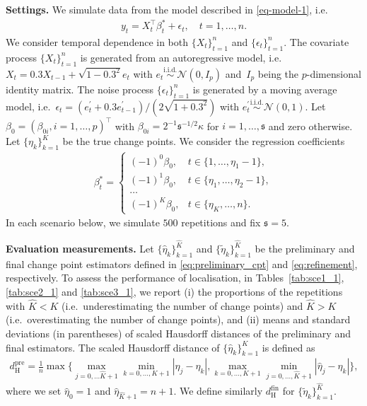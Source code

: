 \documentclass[11pt]{article}
\newcommand{\s}{ { \mathfrak{s}  } }
\theoremstyle{plain}
\theoremstyle{definition}
\begin{document}
\medskip
\noindent \textbf{Settings.} 
We simulate data from the model described in \eqref{eq-model-1}, i.e.
\begin{align*}
  y_t = X_t^{\top}\beta_t^* + \epsilon_t, \quad t = 1, \dots, n.
\end{align*}
We consider temporal dependence in both $\{X_t\}_{t = 1}^n$ and $\{\epsilon_t\}_{t = 1}^n$. The covariate process $\{X_t\}_{t = 1}^n$ is generated from an autoregressive model, i.e.~$X_t = 0.3X_{t-1}+\sqrt{1-0.3^2}e_t$ with $e_t \overset{\mbox{i.i.d.}}{\sim} \mathcal{N}(0, I_p)$ and~$I_p$ being the $p$-dimensional identity matrix. The noise process $\{\epsilon_t\}_{t = 1}^n$ is generated by a moving average model, i.e.~$\epsilon_t = (e^{\prime}_{t}+0.3e^{\prime}_{t-1})/(2\sqrt{1+0.3^2})$ with $e^{\prime}_t \overset{\mbox{i.i.d.}}{\sim} \mathcal{N}(0, 1)$. Let $\beta_0 = (\beta_{0i}, i = 1, \dots, p)^{\top}$ with $\beta_{0i} = 2^{-1}\s^{-1/2}\kappa$ for $i = 1, \dots, \s$ and zero otherwise. Let $\{\eta_k\}_{k = 1}^{K}$ be the true change points.  We consider the regression coefficients
\begin{align*}
    \beta_t^* = \begin{cases}
        (-1)^0\beta_0, &t \in \{1, \dots, \eta_1-1\},\\
        (-1)^1\beta_0, &t \in \{\eta_1, \dots, \eta_2-1\},\\
        \dots \\
        (-1)^{K}\beta_0, &t \in \{\eta_{K}, \dots, n\}.
    \end{cases}
\end{align*}
In each scenario below, we simulate $500$ repetitions and fix $\s = 5$.

\medskip
\noindent \textbf{Evaluation measurements.} Let $\{\widehat{\eta}_k\}_{k = 1}^{\widehat{K}}$ and $\{\widetilde{\eta}_k\}_{k = 1}^{\widehat{K}}$ be the preliminary and final change point estimators defined in \eqref{eq:preliminary_cpt} and \eqref{eq:refinement}, respectively. To assess the performance of localisation, in Tables~\ref{tab:sce1_1}, \ref{tab:sce2_1} and \ref{tab:sce3_1}, we report (i) the proportions of the repetitions with $\widehat{K} < K$ (i.e.~underestimating the number of change points) and $\widehat{K} >K$ (i.e.~overestimating the number of change points), and (ii) means and standard deviations (in parentheses) of scaled Hausdorff distances of the preliminary and final estimators. The scaled Hausdorff distance of $\{\widehat{\eta}_k\}_{k = 1}^{K}$ is defined as
\begin{align*}
    d_{\mathrm{H}}^{\mathrm{pre}} = \frac{1}{n}\max\Big\{\max_{j = 0, \dots \widehat{K}+1}\min_{k = 0, \dots, K+1}|\widehat{\eta}_{j} - \eta_k|, \max_{k = 0, \dots , K+1} \min_{j = 0, \dots, \widehat{K}+1} |\widehat{\eta}_{j} - \eta_k| \Big\},
\end{align*}
where we set $\widehat{\eta}_0 = 1$ and $\widehat{\eta}_{\widehat{K}+1} = n+1$. We define similarly $d_{\mathrm{H}}^{\mathrm{fin}}$ for $\{\widetilde{\eta}_k\}_{k = 1}^{\widehat{K}}$.
\end{document}
